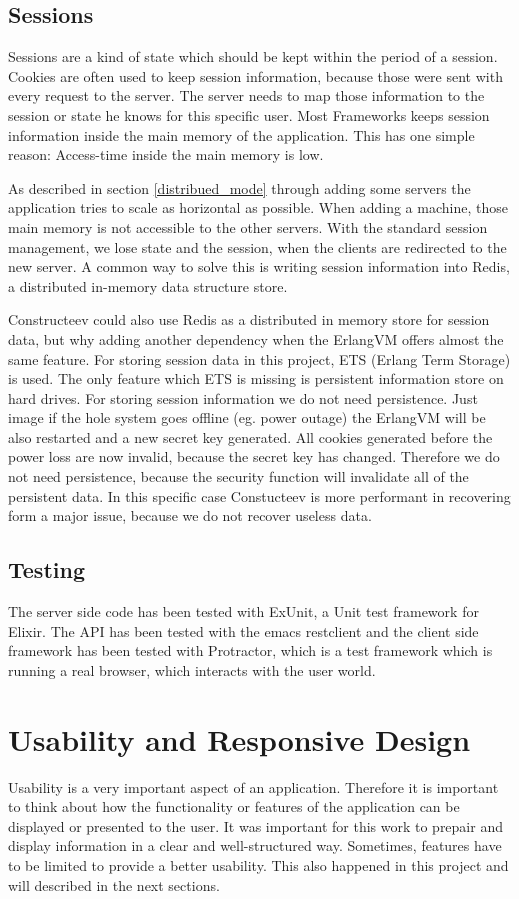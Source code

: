 \section{Sessions}
Sessions are a kind of state which should be kept within the period of a session. Cookies are often used to keep session information, because those were sent with every request to the server. The server needs to map those information to the session or state he knows for this specific user. Most Frameworks keeps session information inside the main memory of the application. This has one simple reason: Access-time inside the main memory is low. 

As described in section \ref{distribued_mode} through adding some servers the application tries to scale as horizontal as possible. When adding a machine, those main memory is not accessible to the other servers. With the standard session management, we lose state and the session, when the clients are redirected to the new server.  A common way to solve this is writing session information into Redis, a distributed in-memory data structure store. 

Constructeev could also use Redis as a distributed in memory store for session data, but why adding another dependency when the ErlangVM offers almost the same feature. For storing session data in this project, ETS (Erlang Term Storage) is used. The only feature which ETS is missing is persistent information store on hard drives. For storing session information we do not need persistence. Just image if the hole system goes offline (eg. power outage) the ErlangVM will be also restarted and a new secret key generated. All cookies generated before the power loss are now invalid, because the secret key has changed. Therefore we do not need persistence, because the security function will invalidate all of the persistent data. In this specific case Constucteev is more performant in recovering form a major issue, because we do not recover useless data.

\section{Testing}
The server side code has been tested with ExUnit, a Unit test framework for Elixir. The API has been tested with the emacs restclient and the client side framework has been tested with Protractor, which is a test framework which is running a real browser, which interacts with the user world.

\chapter{Usability and Responsive Design}
Usability is a very important aspect of an application. Therefore it is important to think about how the functionality or features of the application can be displayed or presented to the user. It was important for this work to prepair and display information in a clear and well-structured way. Sometimes, features have to be limited to provide a better usability. This also happened in this project and will described in the next sections. 

